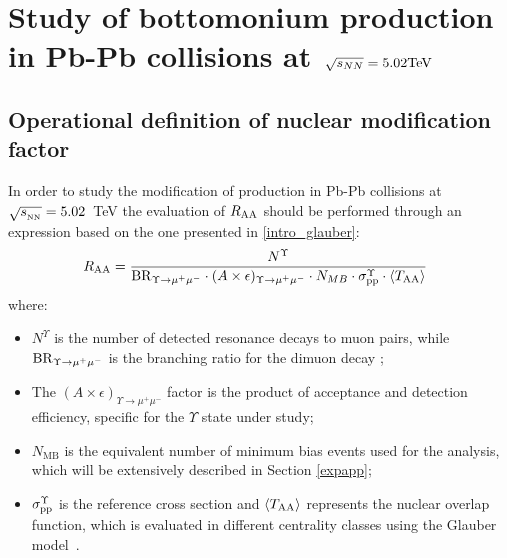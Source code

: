 
\chapter{Study of bottomonium production in Pb-Pb collisions at$\ $ \texorpdfstring{$\sqrt[]{s_{NN}}=5.02 \rm{TeV}$}{sqrt(Snn)=5.02\ \rm{TeV}}}

\section{Operational definition of nuclear modification factor}
In order to study the modification of \upsi production in Pb-Pb collisions at $\sqrt{s_{_{\rm NN}}}=5.02$~\rm{TeV} the evaluation of $R_{\rm AA}$ should be performed through an expression based on the one presented in \ref{intro_glauber}:
\begin{equation} \label{eqn:raa}
R_{\rm{AA}} = \frac{N^{\Upsilon}}{ {\rm BR}_{\Upsilon \rightarrow \mu^{+} \mu^{-}} \cdot  (A\times\epsilon)_{\Upsilon \rightarrow \mu^{+} \mu^{-}} \cdot  N_{MB} \cdot \sigma_{\rm pp}^{\Upsilon} \cdot \langle T_{\rm AA} \rangle } ~~
\end{equation}
where:
\begin{itemize}
\item $N^{\Upsilon}$ is the number of detected resonance decays to muon pairs, while ${\rm BR}_{\Upsilon \rightarrow \mu^{+} \mu^{-}}$ is the branching ratio for the dimuon decay \cite{Agashe:2014kda};
\item The $(A\times\epsilon)_{\Upsilon \rightarrow \mu^{+} \mu^{-}}$ factor is the product of acceptance and detection efficiency, specific for the $\Upsilon$ state under study;
\item $N_{\text{MB}}$ is the equivalent number of minimum bias events used for the analysis, which will be extensively described in Section \ref{expapp};
\item $\sigma_{\rm pp}^{\Upsilon}$ is the reference \pp cross section and $\langle T_{\rm AA} \rangle$ represents the nuclear overlap function, which is evaluated in different centrality classes using the Glauber model~\cite{Abelev:2013qoq,Adam:2015ptt}.
\end{itemize}

